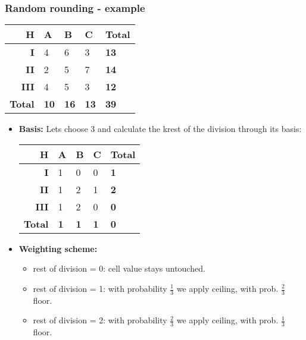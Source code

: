 \begin{frame}\frametitle{Random rounding - example}
		\begin{scriptsize}
		\begin{center}
			\begin{tabular}{|r|lll|l|}
			\hline
			{\bf H} & {\bf A} & {\bf B} & {\bf C} & {\bf Total} \\
			\hline
			{\bf I} 	& 4 & 6 & 3 & {\bf 13} \\
			{\bf II} 	& 2 & 5 & 7 & {\bf 14}\\
			{\bf III} & 4 & 5 & 3 & {\bf 12} \\
			\hline
			{\bf Total} & {\bf 10} & {\bf 16} & {\bf 13}  & {\bf 39} \\
			\hline
			\end{tabular}
		\end{center}
		\end{scriptsize}\pause
		\begin{itemize}
		\item {\bf Basis:} Lets choose 3 and calculate the krest of the division through its basis:\pause
		\begin{scriptsize}
		\begin{center}
			\begin{tabular}{|r|lll|l|}
			\hline
			{\bf H} & {\bf A} & {\bf B} & {\bf C} & {\bf Total} \\
			\hline
			{\bf I} 	& 1 & 0 & 0 & {\bf 1} \\
			{\bf II} 	& 1 & 2 & 1 & {\bf 2}\\
			{\bf III} & 1 & 2 & 0 & {\bf 0} \\
			\hline
			{\bf Total} & {\bf 1} & {\bf 1} & {\bf 1}  & {\bf 0} \\
			\hline
			\end{tabular}
		\end{center}
		\end{scriptsize}\pause
		\item {\bf Weighting scheme:}\pause
		\begin{itemize}
			\item rest of division = 0: cell value stays untouched.\pause
			\item rest of division = 1: with probability $\frac{1}{3}$ we apply ceiling, with prob. $\frac{2}{3}$ floor.\pause
			\item rest of division = 2: with probability $\frac{2}{3}$ we apply ceiling, with prob. $\frac{1}{3}$ floor.
		\end{itemize}
	\end{itemize}
\end{frame}


